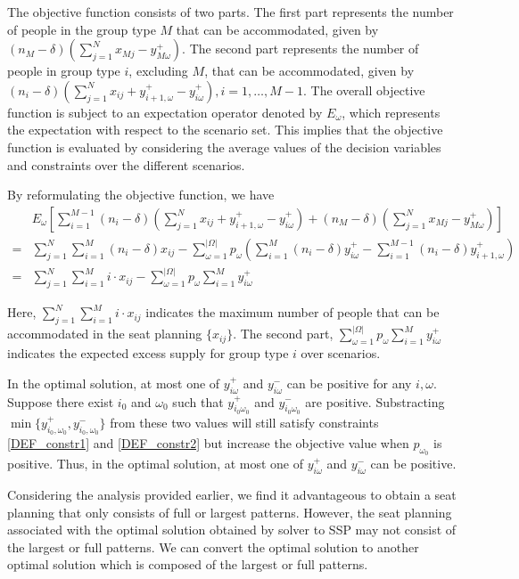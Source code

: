 The objective function consists of two parts. The first part represents the number of people in
the group type $M$ that can be accommodated, given by $(n_{M}-\delta) (\sum_{j=1}^{N} x_{Mj} - y_{M\omega}^{+})$. The second part represents the number of people in group type $i$, excluding $M$, that can be accommodated, given by $(n_i-\delta) (\sum_{j=1}^{N} x_{ij} + y_{i+1,\omega}^{+} - y_{i\omega}^{+}), i = 1, \ldots, M-1$. The overall objective function is subject to an expectation operator denoted by $E_{\omega}$, which represents the expectation with respect to the scenario set. This implies that the objective function is evaluated by considering the average values of the decision variables and constraints over the different scenarios.

By reformulating the objective function, we have
\begin{align*}
  & E_{\omega}\left[\sum_{i=1}^{M-1} (n_i-\delta) (\sum_{j= 1}^{N} x_{ij} + y_{i+1,\omega}^{+} - y_{i \omega}^{+}) + (n_M-\delta) (\sum_{j= 1}^{N} x_{Mj} - y_{M \omega}^{+})\right] \\
  =& \sum_{j =1}^{N} \sum_{i=1}^M (n_i- \delta) x_{ij} - \sum_{\omega =1}^{|\Omega|} p_{\omega} \left(\sum_{i=1}^{M}(n_i- \delta)y_{i \omega}^{+} - \sum_{i=1}^{M-1}(n_i-\delta)y_{i+1, \omega}^{+}\right) \\
  =& \sum_{j =1}^{N} \sum_{i=1}^M i \cdot x_{ij} - \sum_{\omega =1}^{|\Omega|} p_{\omega} \sum_{i = 1}^{M} y_{i \omega}^{+}
\end{align*}

Here, $\sum_{j =1}^{N} \sum_{i=1}^M i \cdot x_{ij}$ indicates the maximum number of people that can be accommodated in the seat planning $\{x_{ij}\}$. The second part, $\sum_{\omega =1}^{|\Omega|} p_{\omega} \sum_{i = 1}^{M} y_{i \omega}^{+}$ indicates the expected excess supply for group type $i$ over scenarios.


In the optimal solution, at most one of $y_{i \omega}^{+}$ and $y_{i \omega}^{-}$ can be positive for any $i, \omega$. Suppose there exist $i_0$ and $\omega_0$ such that $y_{i_0 \omega_0}^{+}$ and $y_{i_0 \omega_0}^{-}$ are positive. Substracting $\min\{y_{i_0, \omega_0}^{+}, y_{i_0, \omega_0}^{-}\}$ from these two values will still satisfy constraints \eqref{DEF_constr1} and \eqref{DEF_constr2} but increase the objective value when $p_{\omega_0}$ is positive. Thus, in the optimal solution, at most one of $y_{i \omega}^{+}$ and $y_{i \omega}^{-}$ can be positive.


Considering the analysis provided earlier, we find it advantageous to obtain a seat planning that only consists of full or largest patterns. However, the seat planning associated with the optimal solution obtained by solver to SSP may not consist of the largest or full patterns. We can convert the optimal solution to another optimal solution which is composed of the largest or full patterns.

